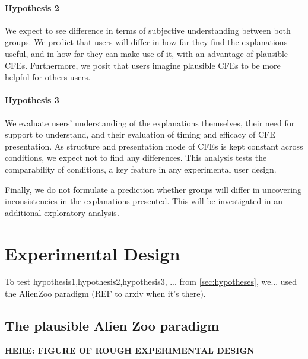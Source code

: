 \paragraph{Hypothesis 2} We expect to see difference in terms of subjective understanding between both groups.
We predict that users will differ in how far they find the explanations useful, and in how far they can make use of it, with an advantage of plausible CFEs. %
Furthermore, we posit that users imagine plausible CFEs to be more helpful for others users. %

\paragraph{Hypothesis 3} We evaluate users' understanding of the explanations themselves, their need for support to understand, and their evaluation of timing and efficacy of \gls{CFE} presentation. As structure and presentation mode of \glspl{CFE} is kept constant across conditions, we expect not to find any differences.
This analysis tests the comparability of conditions, a key feature in any experimental user design.


Finally, we do not formulate a prediction whether groups will differ in uncovering inconsistencies in the explanations presented. This will be investigated in an additional exploratory analysis.%

\section{Experimental Design}\label{sec:experimental-design}
\textcolor{ACMDarkBlue}{
To test hypothesis1,hypothesis2,hypothesis3, ... from \ref{sec:hypotheses}, we... used the AlienZoo paradigm (REF to arxiv when it's there). 
}

\subsection{The plausible Alien Zoo paradigm}

\textbf{HERE: FIGURE OF ROUGH EXPERIMENTAL DESIGN}

